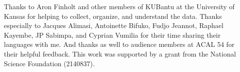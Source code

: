\documentclass[output=paper,colorlinks,citecolor=brown,
]{langscibook}
\begin{document}
Thanks to Aron Finholt and other members of KUBantu at the University of Kansas for helping to collect, organize, and understand the data. Thanks especially to Jacques Alimasi, Antoinette Bifuko, Fudjo Jeannot, Raphael Kayembe, JP Sabimpa, and Cyprian Vumilia for their time sharing their languages with me. And thanks as well to audience members at ACAL 54 for their helpful feedback. This work was supported by a grant from the National Science Foundation (2140837).

\sloppy %

\printbibliography[heading=subbibliography,notkeyword=this]
\end{document}
